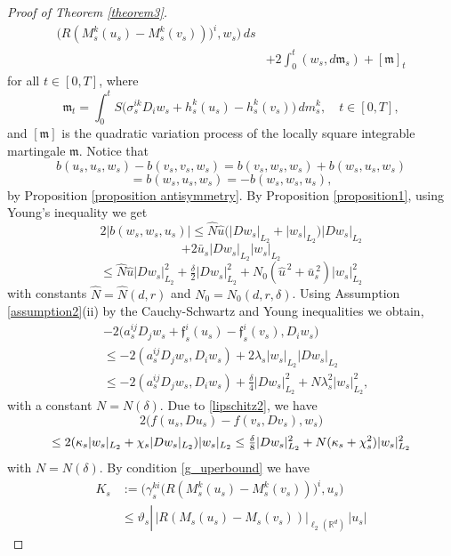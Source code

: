 \documentclass[11pt,reqno]{amsart}
\theoremstyle{definition}
\theoremstyle{remark}
\newcommand\frf{\mathfrak{f}}
\newcommand\frm{\mathfrak{m}}
\newcommand{\<}{\langle}
\renewcommand{\>}{\rangle}
\begin{document}
\begin{proof}[Proof of Theorem \ref{theorem3}]
\begin{align}
\big(R(M_s^k(u_s)-M_s^k(v_s))\big)^i,w_s\Big)\,ds                \nonumber\\
&+2\int_0^t(w_s,d\frm_s)+[\frm]_t                                         \label{1.12.6}
\end{align}
for all $t\in[0,T]$, where
$$
\frm_t=\int_0^tS\big(\sigma_s^{ik}D_i w_{s}+h_s^k(u_s)-h_s^k(v_s)\big)\,dm_s^k, 
\quad t\in[0,T], 
$$
and $[\frm]$ is the quadratic variation process of the locally square 
integrable martingale $\frm$.  
Notice that
$$
b(u_s,u_s,w_s)-b(v_s,v_s,w_s)=b(v_s,w_s,w_s)+b(w_s,u_s,w_s)
$$
\begin{equation}
                                                          \label{identity}
=b(w_s,u_s,w_s)=-b(w_s,w_s,u_s),   
\end{equation}
by Proposition \ref{proposition antisymmetry}. 
By Proposition  \ref{proposition1}, using Young's inequality 
we get 
$$
2|b(w_s,w_s,u_s)|\leq \hat N \hat u
\big(|Dw_s|_{L_2}+|w_s|_{L_2}\big)
|Dw_s|_{L_2}
$$
\begin{equation}
                                                            \label{1.16.6}
+2\bar u_s|Dw_s|_{L_2}|w_s|_{L_2} 
\end{equation}
$$
\leq \hat N\hat u|Dw_s|_{L_2}^2+\tfrac{\delta}{2}|Dw_s|_{L_2}^2
+
N_0(\hat u^{\,2}+\bar u_s^{\,2})|w_s|_{L_2}^2
$$
with constants $\hat N=\hat N(d,r)$ and $N_0=N_0(d,r,\delta)$.
Using Assumption \ref{assumption2}(ii) 
by the Cauchy-Schwartz
and Young inequalities we obtain, 
$$
\begin{aligned}
&
-2\big(a_s^{ij}D_j w_s+\frf_s^i(u_s)-\frf_s^i(v_s),D_i w_s\big)\\
&\leq
-2(a_s^{ij}D_j w_s,D_i w_s)+2\lambda_s|w_s|_{L_2}|Dw_s|_{L_2}\\
&\leq -2(a_s^{ij}D_j w_s,D_i w_s)+\tfrac{\delta}{4}|Dw_s|_{L_2}^2
+N\lambda_s^2|w_s|_{L_2}^2,
\end{aligned}
$$
with a constant $N=N(\delta)$.
Due to \eqref{lipschitz2}, we have 
$$
2\big(f(u_s,Du_s)-f(v_s,Dv_s),w_s\big)
$$
$$
\leq 2(\kappa_s|w_s|_{L_2}+\chi_s|Dw_s|_{L_2})|w_s|_{L_2}\\
\leq\tfrac{\delta}{8}|Dw_s|_{L_2}^2+N(\kappa_s+\chi_s^2)|w_s|_{L_2}^2
$$
with $N=N(\delta)$.
By condition \eqref{g_uperbound} we have  
\begin{align*}
K_s&:=\Big(
\gamma_s^{ki}\big(R(M_s^k(u_s)-M_s^k(v_s))\big)^i,u_s
\Big)                                                                           \\
&\leq\vartheta_s\left|\,
\big|R(M_s(u_s)-M_s(v_s))\big|_{\ell_2(\mathbb R^d)}\,|u_s|

\end{align*}
\end{proof}
\end{document}
